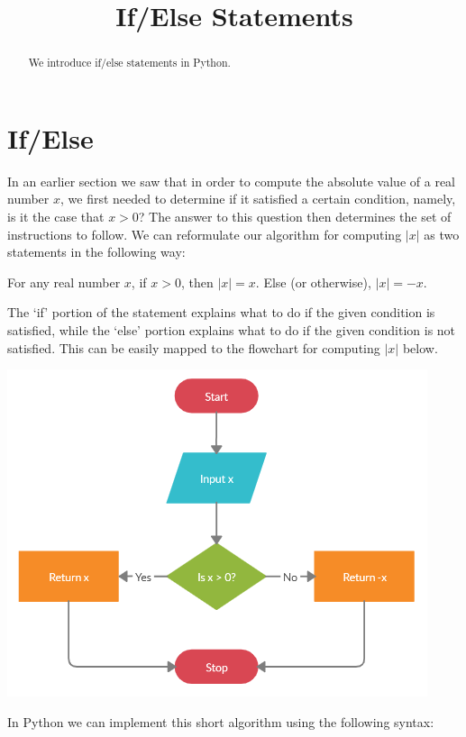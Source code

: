 \documentclass{ximera}
\title{If/Else Statements}
\begin{document}
  
\begin{abstract}  
We introduce if/else statements in Python.
\end{abstract}  
\maketitle

\section{If/Else}

In an earlier section we saw that in order to compute the absolute value of a real number $x$, we first needed to determine if it satisfied a certain condition, namely, is it the case that $x>0$? The answer to this question then determines the set of instructions to follow. We can reformulate our algorithm for computing $|x|$ as two statements in the following way:

For any real number $x$, if $x>0$, then $|x|=x$. Else (or otherwise), $|x|=-x$.

The `if' portion of the statement explains what to do if the given condition is satisfied, while the `else' portion explains what to do if the given condition is not satisfied. This can be easily mapped to the flowchart for computing $|x|$ below.

\begin{center}
	\includegraphics{absalgo.png}
\end{center}

In Python we can implement this short algorithm using the following syntax:
\end{document}
